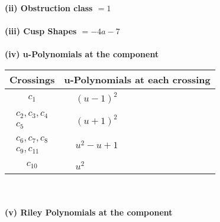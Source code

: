 \documentclass[1p]{elsarticle_modified}
\theoremstyle{definition}
\begin{document}
\flushleft \textbf{(ii) Obstruction class $= 1$}\\~\\
\flushleft \textbf{(iii) Cusp Shapes $= -4 a-7$}\\~\\
\newpage\renewcommand{\arraystretch}{1}
\flushleft \textbf{(iv) u-Polynomials at the component}\newline \\
\begin{tabular}{m{50pt}|m{274pt}}
Crossings & \hspace{64pt}u-Polynomials at each crossing \\
\hline $$\begin{aligned}c_{1}\end{aligned}$$&$\begin{aligned}
&(u-1)^2
\end{aligned}$\\
\hline $$\begin{aligned}c_{2},c_{3},c_{4}\\c_{5}\end{aligned}$$&$\begin{aligned}
&(u+1)^2
\end{aligned}$\\
\hline $$\begin{aligned}c_{6},c_{7},c_{8}\\c_{9},c_{11}\end{aligned}$$&$\begin{aligned}
&u^2- u+1
\end{aligned}$\\
\hline $$\begin{aligned}c_{10}\end{aligned}$$&$\begin{aligned}
&u^2
\end{aligned}$\\
\hline
\end{tabular}\\~\\
\newpage\renewcommand{\arraystretch}{1}
\flushleft \textbf{(v) Riley Polynomials at the component}\newline \\
\end{document}
